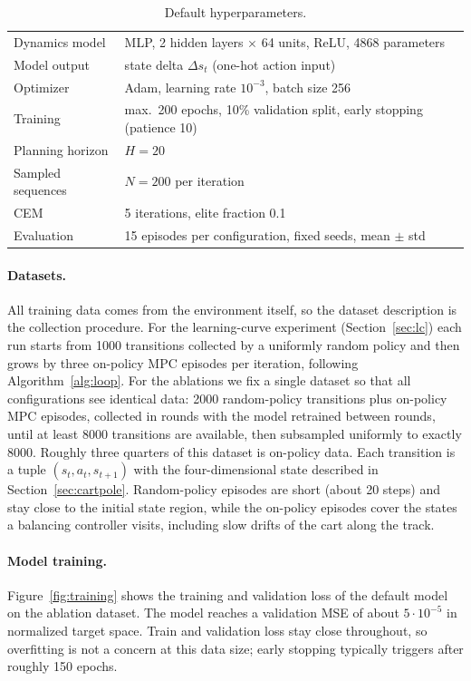 \documentclass{article}
\begin{document}
\begin{table}[t]
  \caption{Default hyperparameters.}
  \label{tab:hyper}
  \centering
  \begin{tabular}{ll}
    \toprule
    Dynamics model & MLP, 2 hidden layers $\times$ 64 units, ReLU, 4868 parameters \\
    Model output & state delta $\Delta s_t$ (one-hot action input) \\
    Optimizer & Adam, learning rate $10^{-3}$, batch size 256 \\
    Training & max.\ 200 epochs, 10\% validation split, early stopping (patience 10) \\
    Planning horizon & $H = 20$ \\
    Sampled sequences & $N = 200$ per iteration \\
    CEM & 5 iterations, elite fraction 0.1 \\
    Evaluation & 15 episodes per configuration, fixed seeds, mean $\pm$ std \\
    \bottomrule
  \end{tabular}
\end{table}

\paragraph{Datasets.} All training data comes from the environment itself, so the dataset description is the collection procedure. For the learning-curve experiment (Section~\ref{sec:lc}) each run starts from 1000 transitions collected by a uniformly random policy and then grows by three on-policy MPC episodes per iteration, following Algorithm~\ref{alg:loop}. For the ablations we fix a single dataset so that all configurations see identical data: 2000 random-policy transitions plus on-policy MPC episodes, collected in rounds with the model retrained between rounds, until at least 8000 transitions are available, then subsampled uniformly to exactly 8000. Roughly three quarters of this dataset is on-policy data. Each transition is a tuple $(s_t, a_t, s_{t+1})$ with the four-dimensional state described in Section~\ref{sec:cartpole}. Random-policy episodes are short (about 20 steps) and stay close to the initial state region, while the on-policy episodes cover the states a balancing controller visits, including slow drifts of the cart along the track.

\paragraph{Model training.} Figure~\ref{fig:training} shows the training and validation loss of the default model on the ablation dataset. The model reaches a validation MSE of about $5 \cdot 10^{-5}$ in normalized target space. Train and validation loss stay close throughout, so overfitting is not a concern at this data size; early stopping typically triggers after roughly 150 epochs.
\end{document}
